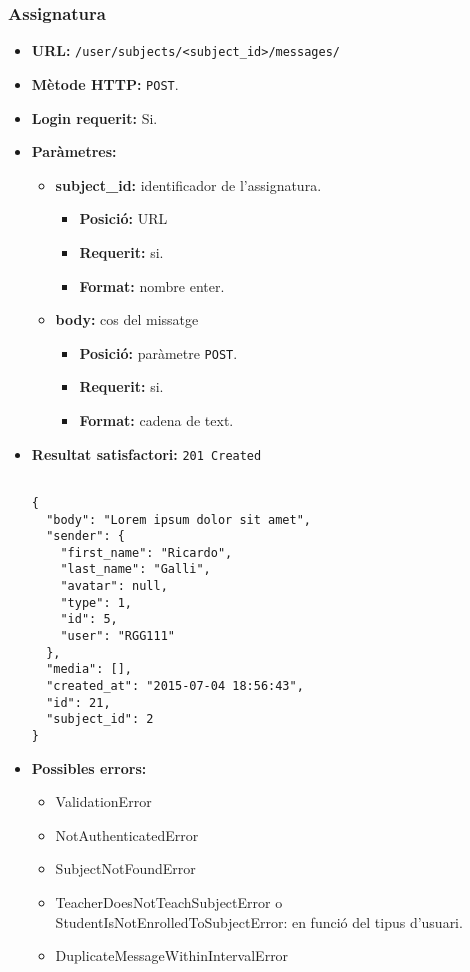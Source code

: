 	\subsubsection{Assignatura}
	\begin{itemize}
\item \textbf{\ac{URL}:} \texttt{/user/subjects/<subject\_id>/messages/}
\item \textbf{Mètode \ac{HTTP}: } \texttt{POST}.
\item \textbf{Login requerit:} Si.
\item \textbf{Paràmetres:}
	\begin{itemize}
		\item \textbf{subject\_id:} identificador de l'assignatura.
		\begin{itemize}
			\item \textbf{Posició:} \ac{URL}
			\item \textbf{Requerit:} si.
			\item \textbf{Format:} nombre enter.
		\end{itemize}
		\item \textbf{body:} cos del missatge
		\begin{itemize}
			\item \textbf{Posició:} paràmetre \texttt{POST}.
			\item \textbf{Requerit:} si.
			\item \textbf{Format:} cadena de text.
		\end{itemize}
	\end{itemize}
\item \textbf{Resultat satisfactori:} \texttt{201 Created}
	\begin{verbatim}
	
{
  "body": "Lorem ipsum dolor sit amet",
  "sender": {
    "first_name": "Ricardo",
    "last_name": "Galli",
    "avatar": null,
    "type": 1,
    "id": 5,
    "user": "RGG111"
  },
  "media": [],
  "created_at": "2015-07-04 18:56:43",
  "id": 21,
  "subject_id": 2
}
	\end{verbatim}
\item \textbf{Possibles errors:}
	\begin{itemize}
		\item ValidationError
		\item NotAuthenticatedError
		\item SubjectNotFoundError
		\item TeacherDoesNotTeachSubjectError o StudentIsNotEnrolledToSubjectError: en funció del tipus d'usuari.
		\item DuplicateMessageWithinIntervalError
	\end{itemize}
	\end{itemize}
	
